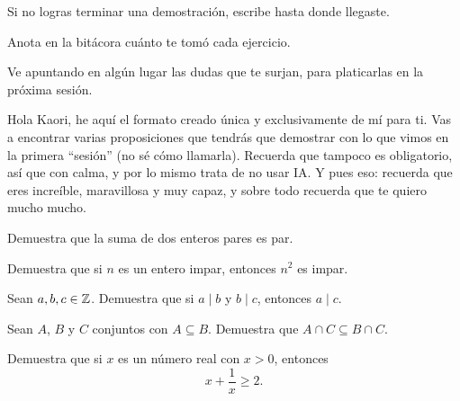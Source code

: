 \documentclass[12pt,a4paper]{article}
\begin{document}
    \encabezado

    \begin{indicaciones}
        \item Si no logras terminar una demostración, escribe hasta donde llegaste.
        \item Anota en la bitácora cuánto te tomó cada ejercicio.
        \item Ve apuntando en algún lugar las dudas que te surjan, para platicarlas en la próxima sesión.
    \end{indicaciones}

    \begin{mensaje}
        Hola Kaori, he aquí el formato creado única y exclusivamente de mí para ti. Vas a encontrar varias proposiciones que tendrás que demostrar con lo que vimos en la primera \enquote{sesión} (no sé cómo llamarla). Recuerda que tampoco es obligatorio, así que con calma, y por lo mismo trata de no usar IA. Y pues eso: recuerda que eres increíble, maravillosa y muy capaz, y sobre todo recuerda que te quiero mucho mucho.
    \end{mensaje}


    \begin{ejercicio}[1]
        Demuestra que la suma de dos enteros pares es par.
    \end{ejercicio}

    \begin{ejercicio}[1]
        Demuestra que si $n$ es un entero impar, entonces $n^2$ es impar.
    \end{ejercicio}

    \begin{ejercicio}[1]
        Sean $a,b,c\in\mathbb{Z}$. Demuestra que si $a\mid b$ y $b\mid c$, entonces $a\mid c$.
    \end{ejercicio}

    \begin{ejercicio}[2]
        Sean $A$, $B$ y $C$ conjuntos con $A\subseteq B$. Demuestra que $A\cap C\subseteq B\cap C$.
    \end{ejercicio}

    \begin{ejercicio}[2]
        Demuestra que si $x$ es un número real con $x>0$, entonces
        \begin{equation*}
            x+\frac{1}{x}\geq2.
        \end{equation*}
    \end{ejercicio}
\end{document}
